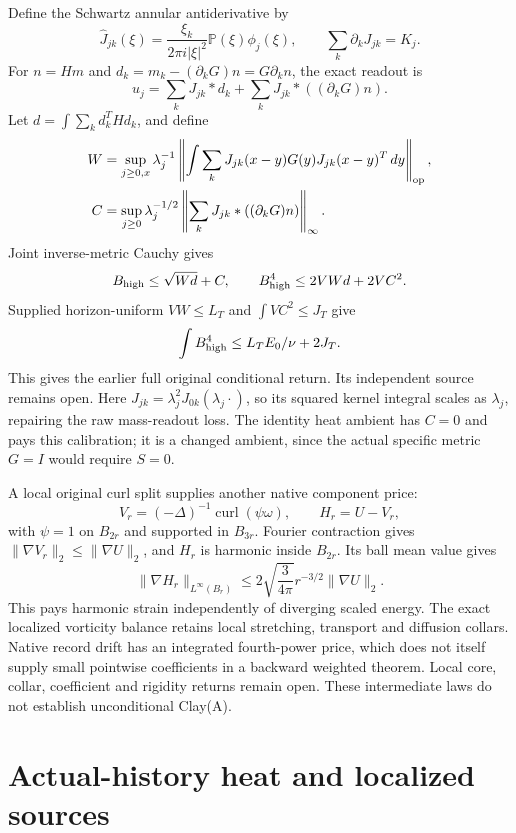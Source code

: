 \documentclass[11pt]{article}
\begin{document}
Define the Schwartz annular antiderivative by
\[
 \widehat J_{jk}(\xi)=\frac{\xi_k}{2\pi i|\xi|^2}
               \mathbb P(\xi)\phi_j(\xi),\qquad
 \sum_k\partial_kJ_{jk}=K_j.
\]
For $n=Hm$ and $d_k=m_k-(\partial_kG)n=G\partial_kn$, the exact readout is
\[
 u_j=\sum_kJ_{jk}*d_k+\sum_kJ_{jk}*((\partial_kG)n).
\]
Let $d=\int\sum_kd_k^THd_k$, and define
\[
 \begin{aligned}
 W&=\sup_{j\ge0,x}\lambda_j^{-1}
   \left\|\int\sum_kJ_{jk}(x-y)G(y)J_{jk}(x-y)^T\,dy\right\|_{\rm op},\\
 C&=\sup_{j\ge0}\lambda_j^{-1/2}
       \left\|\sum_kJ_{jk}*((\partial_kG)n)\right\|_\infty.
 \end{aligned}
\]
Joint inverse-metric Cauchy gives
\[
 B_{\rm high}\le\sqrt{Wd}+C,\qquad
 B_{\rm high}^4\le2VWd+2VC^2.
\]
Supplied horizon-uniform $VW\le L_T$ and $\int VC^2\le J_T$ give
\[
 \int B_{\rm high}^4\le L_TE_0/\nu+2J_T.
\]
This gives the earlier full original conditional return.
Its independent source remains open. Here
$J_{jk}=\lambda_j^2J_{0k}(\lambda_j\cdot)$, so its squared kernel integral
scales as $\lambda_j$, repairing the raw mass-readout loss. The identity
heat ambient has $C=0$ and pays this calibration; it is a changed ambient,
since the actual specific metric $G=I$ would require $S=0$.

A local original curl split supplies another native component price:
\[
 V_r=(-\Delta)^{-1}\operatorname{curl}(\psi\omega),\qquad
 H_r=U-V_r,
\]
with $\psi=1$ on $B_{2r}$ and supported in $B_{3r}$.
Fourier contraction gives $\|\nabla V_r\|_2\le\|\nabla U\|_2$,
and $H_r$ is harmonic inside $B_{2r}$. Its ball mean value gives
\[
 \|\nabla H_r\|_{L^\infty(B_r)}
 \le2\sqrt{\frac3{4\pi}}r^{-3/2}\|\nabla U\|_2.
\]
This pays harmonic strain independently of diverging scaled energy.
The exact localized vorticity balance retains local stretching, transport
and diffusion collars. Native record drift has an integrated fourth-power
price, which does not itself supply small pointwise coefficients in a
backward weighted theorem. Local core, collar, coefficient and rigidity
returns remain open. These intermediate laws do not establish
unconditional Clay(A).


\section{Actual-history heat and localized sources}
\end{document}
